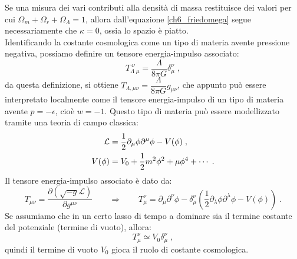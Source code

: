 \documentclass[12pt,a4paper]{report}
\theoremstyle{definition}
\newcommand{\lag}{\mathcal{L}}
\begin{document}
Se una misura dei vari contributi alla densità di massa restituisce dei valori per cui $\Omega_m+\Omega_r+\Omega_{\Lambda}=1$, allora dall'equazione \eqref{ch6_friedomega} segue necessariamente che $\kappa=0$, ossia lo spazio è piatto. \\
Identificando la costante cosmologica come un tipo di materia avente pressione negativa, possiamo definire un tensore energia-impulso associato:
\begin{equation}
T_{\Lambda\;\mu}^{\;\nu}=\frac{\Lambda}{8\pi G}\delta_{\mu}^{\nu}\;,
\end{equation}
da questa definizione, si ottiene $T_{\Lambda,\mu\nu}=\dfrac{\Lambda}{8\pi G}g_{\mu\nu}$, che appunto può essere interpretato localmente come il tensore energia-impulso di un tipo di materia avente $p=-\epsilon$, cioè $w=-1$. Questo tipo di materia può essere modellizzato tramite una teoria di campo classica:
\begin{align}
\lag &= \frac{1}{2}\partial_{\mu}\phi\partial^{\mu}\phi-V(\phi)\;, \\
V(\phi) &= V_0+\frac{1}{2}m^2\phi^2+\mu\phi^4+\cdots\;. \notag
\end{align}
Il tensore energia-impulso associato è dato da:
\begin{equation}
T_{\mu\nu}=\frac{\partial (\sqrt{-g}\lag)}{\partial g^{\mu\nu}}\qquad \Longrightarrow\qquad T_{\mu}^{\nu}=\partial_{\mu}\partial^{\nu}\phi-\delta_{\mu}^{\nu}\left(\frac{1}{2}\partial_{\lambda}\phi\partial^{\lambda}\phi-V(\phi)\right)\;.
\end{equation}
Se assumiamo che in un certo lasso di tempo a dominare sia il termine costante del potenziale (termine di vuoto), allora:
$$
T_{\mu}^{\nu}\simeq V_0\delta_{\mu}^{\nu}\;,
$$
quindi il termine di vuoto $V_0$ gioca il ruolo di costante cosmologica.
\end{document}
